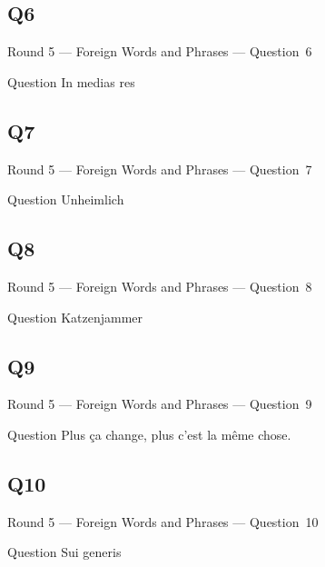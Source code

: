 \documentclass[11pt]{beamer}
\begin{document}
\subsection*{Q6}
\begin{frame}[t]{Round 5 --- Foreign Words and Phrases --- \mbox{Question 6}}
    \vspace{-0.5em}
    \begin{block}{Question}
        In medias res
    \end{block}
\end{frame}
\subsection*{Q7}
\begin{frame}[t]{Round 5 --- Foreign Words and Phrases --- \mbox{Question 7}}
    \vspace{-0.5em}
    \begin{block}{Question}
        Unheimlich
    \end{block}
\end{frame}
\subsection*{Q8}
\begin{frame}[t]{Round 5 --- Foreign Words and Phrases --- \mbox{Question 8}}
    \vspace{-0.5em}
    \begin{block}{Question}
        Katzenjammer
    \end{block}
\end{frame}
\subsection*{Q9}
\begin{frame}[t]{Round 5 --- Foreign Words and Phrases --- \mbox{Question 9}}
    \vspace{-0.5em}
    \begin{block}{Question}
        Plus ça change, plus c'est la même chose.
    \end{block}
\end{frame}
\subsection*{Q10}
\begin{frame}[t]{Round 5 --- Foreign Words and Phrases --- \mbox{Question 10}}
    \vspace{-0.5em}
    \begin{block}{Question}
        Sui generis
    \end{block}
\end{frame}
\end{document}
